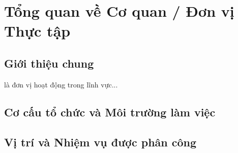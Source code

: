 \chapter{Tổng quan về Cơ quan / Đơn vị Thực tập}
\label{chap:company-overview}

\section{Giới thiệu chung}
\label{sec:company-intro}
\CompanyName{} là đơn vị hoạt động trong lĩnh vực...

\section{Cơ cấu tổ chức và Môi trường làm việc}
\label{sec:organization-structure}

\section{Vị trí và Nhiệm vụ được phân công}
\label{sec:assigned-role}
